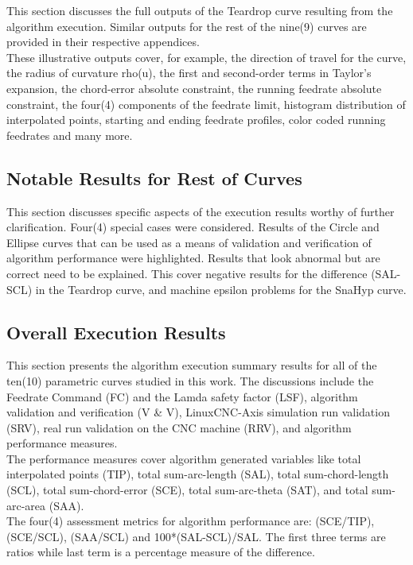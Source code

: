 This section discusses the full outputs of the Teardrop curve resulting from the algorithm execution. Similar outputs for the rest of the nine(9) curves are provided in their respective appendices.\\

These illustrative outputs cover, for example, the direction of travel for the curve, the radius of curvature rho(u), the first and second-order terms in Taylor's expansion, the chord-error absolute constraint, the running feedrate absolute constraint, the four(4) components of the feedrate limit, histogram distribution of interpolated points, starting and ending feedrate profiles, color coded running feedrates and many more.

\subsection{Notable Results for Rest of Curves}

This section discusses specific aspects of the execution results worthy of further clarification. Four(4) special cases were considered. Results of the Circle and Ellipse curves that can be used as a means of validation and verification of algorithm performance were highlighted. Results that look abnormal but are correct need to be explained. This cover negative results for the difference (SAL-SCL) in the Teardrop curve, and machine epsilon problems for the SnaHyp curve. 

\subsection{Overall Execution Results}

This section presents the algorithm execution summary results for all of the ten(10) parametric curves studied in this work. The discussions include the Feedrate Command (FC) and the Lamda safety factor (LSF), algorithm validation and verification (V \& V), LinuxCNC-Axis simulation run validation (SRV), real run validation on the CNC machine (RRV), and algorithm performance measures.\\

The performance measures cover algorithm generated variables like total interpolated points (TIP), total sum-arc-length (SAL), total sum-chord-length (SCL), total sum-chord-error (SCE), total sum-arc-theta (SAT), and total sum-arc-area (SAA). \\

The four(4) assessment metrics for algorithm performance are: (SCE/TIP), (SCE/SCL), (SAA/SCL) and 100*(SAL-SCL)/SAL. The first three terms are ratios while last term is a percentage measure of the difference.


